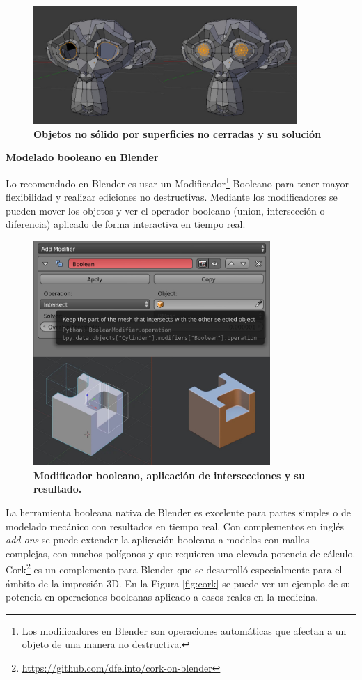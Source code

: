 \begin{figure}[h]
\includegraphics[width=10cm]{Img/Modelos/modelado21.jpg}
\centering
\caption{\textbf{ \footnotesize{Objetos no sólido por superficies no cerradas y su solución }}}
\label{fig:blender}
\end{figure}


\textbf{Modelado booleano en Blender}

Lo recomendado en Blender es usar un Modificador\footnote{
Los modificadores en Blender son operaciones automáticas que afectan a un objeto de una manera no destructiva.} Booleano para tener mayor flexibilidad y realizar ediciones no destructivas. Mediante los modificadores se pueden mover los objetos y ver el operador booleano (union, intersección o diferencia) aplicado de forma interactiva en tiempo real.

\begin{figure}[h]
\includegraphics[width=9cm]{Img/Modelos/modelado22.jpg}
\centering
\caption{\textbf{ \footnotesize{Modificador booleano, aplicación de intersecciones y su resultado. }}}
\end{figure}

La herramienta booleana nativa de Blender es excelente para partes simples o de modelado mecánico con resultados en tiempo real. Con complementos en inglés \textit{add-ons} se puede extender la aplicación booleana a modelos con mallas complejas, con muchos polígonos y que requieren una elevada potencia de cálculo.
Cork\footnote{\url{https://github.com/dfelinto/cork-on-blender}} es un complemento para Blender que se desarrolló especialmente para el ámbito de la impresión 3D. En la Figura \ref{fig:cork} se puede ver un ejemplo de su potencia en operaciones booleanas aplicado a casos reales en la medicina.

